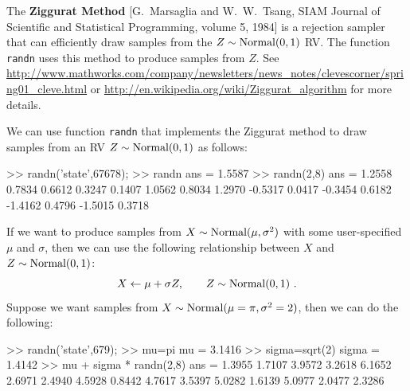 The {\bf Ziggurat Method} [G.~Marsaglia and W.~W.~Tsang, SIAM Journal of Scientific and Statistical Programming, volume 5, 1984] is a rejection sampler that can efficiently draw samples from the $Z \sim \mbox{{\rm Normal}}(0,1)$ RV.  The \Matlab function {\tt randn} uses this method to produce samples from $Z$.  See  \href{http://www.mathworks.com/company/newsletters/news_notes/clevescorner/spring01_cleve.html}{\url{http://www.mathworks.com/company/newsletters/news_notes/clevescorner/spring01_cleve.html}} or \href{http://en.wikipedia.org/wiki/Ziggurat_algorithm}{\url{http://en.wikipedia.org/wiki/Ziggurat_algorithm}} for more details.

\begin{labwork}\label{LW:randn}
We can use \Matlab function {\tt randn} that implements the Ziggurat method to draw samples from an RV $Z \sim \mbox{{\rm Normal}}(0,1)$ as follows:
\begin{VrbM}
>> randn('state',67678); %
>> randn %
ans =    1.5587
>> randn(2,8) %
ans =
    1.2558    0.7834    0.6612    0.3247    0.1407    1.0562    0.8034    1.2970
   -0.5317    0.0417   -0.3454    0.6182   -1.4162    0.4796   -1.5015    0.3718
\end{VrbM}
If we want to produce samples from $X \sim \mbox{{\rm Normal}}(\mu,\sigma^2)$ with some user-specified $\mu$ and $\sigma$, then we can use the following relationship between $X$ and $Z \sim \mbox{{\rm Normal}}(0,1)$:
\[
X \gets \mu + \sigma Z, \qquad Z \sim \mbox{{\rm Normal}}(0,1) \ .
\]
Suppose we want samples from $X \sim \mbox{{\rm Normal}}(\mu=\pi, \sigma^2=2)$, then we can do the following:
\begin{VrbM}
>> randn('state',679); %
>> mu=pi %
mu =    3.1416
>> sigma=sqrt(2) %
sigma =    1.4142
>> mu + sigma * randn(2,8) %
ans =
    1.3955    1.7107    3.9572    3.2618    6.1652    2.6971    2.4940    4.5928
    0.8442    4.7617    3.5397    5.0282    1.6139    5.0977    2.0477    2.3286
\end{VrbM}
\end{labwork}

